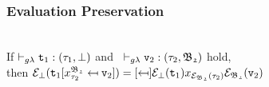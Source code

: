\subsubsection{Evaluation Preservation}
\begin{lemma} ~\\
If $\vdash_{g\lambda} \texttt{t}_{1} : (\tau_{1}, \bot)$  
and 
	\mbox{
		$\vdash_{g\lambda} \texttt{v}_{2} : (\tau_{2}, \mathfrak{B_{2}})$}	
hold, \\ 
then
$\e_{\bot}
	(\sbst
		{\texttt{t}_{1}}
		{x^{\mathfrak{B_{2}}}_{\tau_{2}}}
		{\texttt{v}_{2}})
= \sbst
		{\e_{\bot}(\texttt{t}_{1})}
		{x_{\e_{\mathfrak{B_{2}}}(\tau_{2})}}
		{\e_{\mathfrak{B_{2}}}(\texttt{v}_{2})}$
\label{Substitution under erasure}
\end{lemma}

